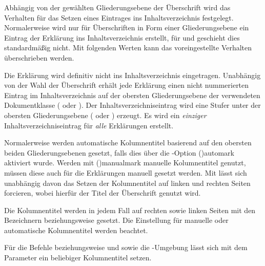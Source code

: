 \begin{DeclareEntity*}{}
\begin{DeclareEntity*}{}
\begin{DeclareEntity*}{}
\begin{Declaration}
Abhängig von der gewählten Gliederungsebene der Überschrift wird das Verhalten 
für das Setzen eines Eintrages ins Inhaltsverzeichnis festgelegt. Normalerweise 
wird nur für Überschriften in Form einer Gliederungsebene ein Eintrag der 
Erklärung ins Inhaltsverzeichnis erstellt, für  und 
 geschieht dies standardmäßig nicht. Mit folgenden 
Werten kann das voreingestellte Verhalten überschrieben werden.
%
\begin{DeclareValues}[Inhaltsverzeichnis]{}
  Die Erklärung wird definitiv nicht ins Inhaltsverzeichnis eingetragen.
  Unabhängig von der Wahl der Überschrift erhält jede Erklärung einen nicht
  nummerierten Eintrag im Inhaltsverzeichnis auf der obersten Gliederungsebene 
  der verwendeten Dokumentklasse ( oder ). 
  Der Inhaltsverzeichniseintrag wird eine Stufer unter der obersten 
  Gliederungsebene ( oder ) erzeugt.
  Es wird ein \emph{einziger} Inhaltsverzeichniseintrag für \emph{alle} 
  Erklärungen erstellt.
\end{DeclareValues}

%
%
Normalerweise werden automatische Kolumnentitel basierend auf den obersten 
beiden Gliederungsebenen gesetzt, falls dies über die 
\KOMAScript-Option \Option(){automark} aktiviert 
wurde. Werden mit \Option(){manualmark} manuelle 
Kolumnentitel genutzt, müssen diese auch für die Erklärungen manuell gesetzt 
werden. Mit  lässt sich unabhängig davon das 
Setzen der Kolumnentitel auf linken und rechten Seiten forcieren, wobei 
hierfür der Titel der Überschrift genutzt wird.
%
\begin{DeclareValues}[Kolumnentitel]{}
  Die Kolumnentitel werden in jedem Fall auf rechten sowie linken Seiten mit 
  den Bezeichnern  beziehungsweise  
  gesetzt.
  Die Einstellung für manuelle oder automatische Kolumnentitel werden beachtet.
\end{DeclareValues}
Für die Befehle  beziehungsweise  und 
 sowie die -Umgebung lässt sich mit 
dem Parameter  ein beliebiger Kolumnentitel 
setzen.


\end{Declaration}
\end{DeclareEntity*}
\end{DeclareEntity*}
\end{DeclareEntity*}
